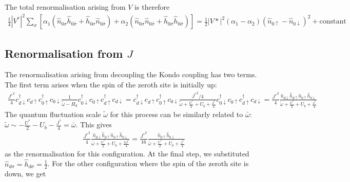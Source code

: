 The total renormalisation arising from \(V\) is therefore
\begin{equation}\begin{aligned}
	\frac{1}{4}|V^*|^2 \sum_\sigma \left[\alpha_1 \left( \hat n_{0\sigma}\hat h_{0\bar\sigma} + \hat h_{0\sigma}\hat n_{0\bar\sigma}\right) + \alpha_2 \left( \hat n_{0\sigma}\hat n_{0\bar\sigma} + \hat h_{0\sigma}\hat h_{0\bar\sigma}\right)\right] = \frac{1}{2}|V*|^2 \left(\alpha_1 - \alpha_2\right) \left(\hat n_{0 \uparrow} - \hat n_{0 \downarrow}\right)^2 + \text{constant}
\end{aligned}\end{equation}

\subsection{Renormalisation from \(J\)}
The renormalisation arising from decoupling the Kondo coupling has two terms. The first term arises when the spin of the zeroth site is initially up:
\begin{equation}\begin{aligned}
	\frac{{J^*}^2}{4}c^\dagger_{d \downarrow}c_{d \uparrow} c^\dagger_{0 \uparrow}c_{0 \downarrow} \frac{1}{\tilde \omega - H_d} c^\dagger_{0 \downarrow}c_{0 \uparrow} c^\dagger_{d \uparrow}c_{d \downarrow} = c^\dagger_{d \downarrow}c_{d \uparrow} c^\dagger_{0 \uparrow}c_{0 \downarrow} \frac{{J^*}^2/4}{\tilde \omega + \frac{U^*}{2} + U_b + \frac{J^*}{4}} c^\dagger_{0 \downarrow}c_{0 \uparrow} c^\dagger_{d \uparrow}c_{d \downarrow} = \frac{{J^*}^2}{4}\frac{\hat n_{d \downarrow} \hat h_{d \uparrow} \hat n_{ 0 \uparrow} \hat h_{0 \downarrow}}{\tilde \omega + \frac{U^*}{2} + U_b + \frac{J^*}{4}} 
\end{aligned}\end{equation}
The quantum fluctuation scale \(\tilde \omega\) for this process can be similarly related to \(\bar\omega\): \(\tilde\omega \sim -\frac{U^*}{2} - U_b - \frac{J^*}{4} = \bar\omega\). This gives
\begin{equation}\begin{aligned}
	\frac{{J^*}^2}{4}\frac{\hat n_{d \downarrow} \hat h_{d \uparrow} \hat n_{ 0 \uparrow} \hat h_{0 \downarrow}}{\bar\omega + \frac{U^*}{2} + U_b + \frac{3J^*}{4}} = \frac{{J^*}^2}{16}\frac{\hat n_{ 0 \uparrow} \hat h_{0 \downarrow}}{\bar\omega + \frac{U^*}{2} + U_b + \frac{J^*}{4}}
\end{aligned}\end{equation}
as the renormalisation for this configuration. At the final step, we substituted \(\hat n_{d\sigma} = \hat h_{d\sigma} = \frac{1}{2}\). For the other configuration where the spin of the zeroth site is down, we get
